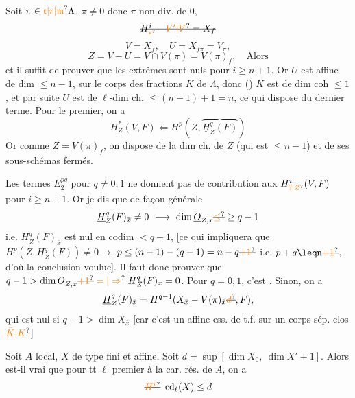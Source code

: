 Soit $\pi\in\unsure{\mathfrak r|r|\mathfrak m}\Lambda$, $\pi\ne0$ donc $\pi$
non div. de 0,  
\[
\deleted{H^{i}_{\unsure{*}}\quad\unsure{V'|V}=X_f}
\]
\[
V=X_f,\quad U=X_{f\pi}=V_{\pi},
\]
\[
Z=V-U=V\cap V(\pi)=V(\pi)_f,\quad \text{Alors}
\]
et il suffit de prouver que les extrêmes
sont nuls pour $i\geq n+1$. Or $U$ est affine de dim
$\leq n-1$,  sur le corps des fractions $K$ de $\Lambda$,
\margin{\#} donc () $K$ est de dim coh $\leq1$, et
par suite $U$ est de $\ell$-dim ch. $\leq(n-1)+1=n$,
 ce qui dispose du dernier terme.
Pour le premier, on a
\[
H_Z^*(V,F)\Longleftarrow H^p(Z,\overbrace{\underline H_Z^q(F)})
\]
Or  comme $Z=V(\pi)_f$,  on
dispose de la dim ch. de $Z$ (qui est
$\leq n-1$) et de ses sous-schémas fermés.

Les termes $E_2^{pq}$ pour $q\ne0,1$ ne donnent
pas de contribution aux $H_{\unsure{?|Z}}^i(V,F)$ pour $i\geq n+1$.
 Or je dis que de façon générale
\[
\underline H_Z^q(F)_{\bar x}\ne0\ \longrightarrow\ \dim\underline O_{Z,x}\deleted{\unsure{\leq}}\geq q-1
\]
i.e. $\underline H_Z^q(F)_{\bar x}$ est nul en codim $<q-1$,
[ce qui impliquera que $H^p(Z,\underline H_Z^q(F))\ne0\longrightarrow$
$p\leq(n-1)-(q-1)=n-q\deleted{\unsure{+1}}$ i.e. $p+q\leqn\deleted{\unsure{+1}}$, d'où
la conclusion voulue]. Il faut donc prouver que $q-1>\dim\underline O_{Z,x}\deleted{\unsure{+1}}\mathrel{\unsure{=|\Rightarrow}}\underline H_Z^q(F)_{\bar x}=0$.
Pour $q=0,1$, c'est . Sinon, on a
\[
\underline H_Z^q(F)_{\bar x}=H^{q-1}(X_{\bar x}-V(\pi)_{\bar x}\deleted{\unsure{d}},F),
\]
qui est  nul
si $q-1>\dim X_{\bar x}$ [car  c'est un
affine ess. de t.f. sur un corps sép. clos $\unsure{\bar K|K}$]

  Soit $A$  local,  $X$  de type fini
et affine,  
Soit  $d=\sup[\dim X_0,\ \dim X'+1]$.
Alors est-il vrai que pour tt $\ell$
premier à la car. rés. de $A$, on a
\[
\deleted{\unsure{H^i}}\ \operatorname{cd}_{\ell}(X)\leq d
\]

